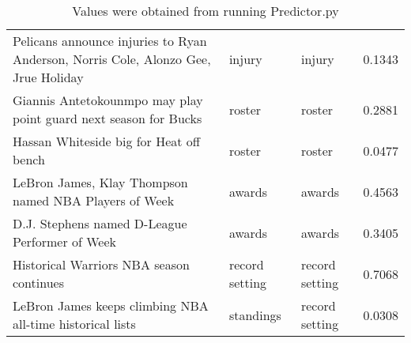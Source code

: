 \begin{table}[!htbp]
\begin{center}
\begin{tabular}{ l l l l}
Pelicans announce injuries to Ryan Anderson, Norris Cole, Alonzo Gee, Jrue Holiday & injury & injury & 0.1343\\
Giannis Antetokounmpo may play point guard next season for Bucks & roster & roster & 0.2881\\
Hassan Whiteside big for Heat off bench & roster & roster & 0.0477\\
LeBron James, Klay Thompson named NBA Players of Week & awards & awards & 0.4563\\
D.J. Stephens named D-League Performer of Week & awards & awards & 0.3405\\
Historical Warriors NBA season continues & record setting & record setting & 0.7068\\
LeBron James keeps climbing NBA all-time historical lists & standings & record setting & 0.0308\\
\hline
		\end{tabular}
	\caption*{\scriptsize Values were obtained from running Predictor.py}
	 \end{center}
\end{table}

